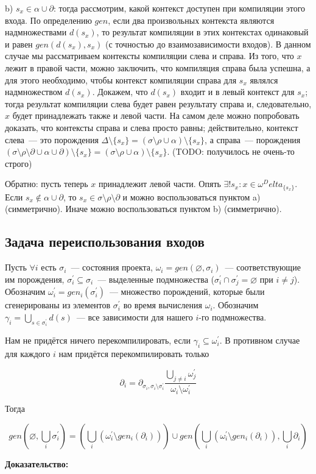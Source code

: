 b) $s_x \in \alpha \cup \partial$: тогда рассмотрим, какой контекст доступен при компиляции этого входа. По определению $gen$, если два произвольных контекста являются надмножествами $d(s_x)$, то результат компиляции в этих контекстах одинаковый и равен $gen(d(s_x), s_x)$ (с точностью до взаимозависимости входов). В данном случае мы рассматриваем контексты компиляции слева и справа. Из того, что $x$ лежит в правой части, можно заключить, что компиляция справа была успешна, а для этого необходимо, чтобы контекст компиляции справа для $s_x$ являлся надмножеством $d(s_x)$. Докажем, что $d(s_x)$ входит и в левый контекст для $s_x$; тогда результат компиляции слева будет равен результату справа и, следовательно, $x$ будет принадлежать также и левой части. На самом деле можно попробовать доказать, что контексты справа и слева просто равны; действительно, контекст слева~--- это порождения $\Delta\setminus\{s_x\} = (\sigma\setminus\rho\cup\alpha)\setminus\{s_x\}$, а справа~--- порождения $(\sigma\setminus\rho\setminus\partial\cup\alpha\cup\partial) \setminus \{s_x\} = (\sigma\setminus\rho\cup\alpha) \setminus \{s_x\}$. (TODO: получилось не очень-то строго)

Обратно: пусть теперь $x$ принадлежит левой части. Опять $\exists ! s_x : x \in \omega^Delta_{\{s_x\}}$. Если $s_x \notin \alpha\cup\partial$, то $s_x \in \sigma\setminus\rho\setminus\partial$ и можно воспользоваться пунктом a) (симметрично). Иначе можно воспользоваться пунктом b) (симметрично).

\subsection{Задача переиспользования входов}

Пусть $\forall i$ есть $\sigma_i$~--- состояния проекта, $\omega_i = gen(\varnothing, \sigma_i)$~--- соответствующие им порождения, $\sigma_i^\prime \subseteq \sigma_i$~--- выделенные подмножества ($\sigma_i^\prime \cap \sigma_j^\prime = \varnothing$ при $i \neq j$). Обозначим $\omega_i^\prime = gen_i(\sigma_i^\prime)$~--- множество порождений, которые были сгенерированы из элементов $\sigma_i^\prime$ во время вычисления $\omega_i$. Обозначим $\gamma_i = \bigcup\limits_{s \in \sigma_i^\prime} d(s)$~--- все зависимости для нашего $i$-го подмножества.

Нам не придётся ничего перекомпилировать, если $\gamma_i \subseteq \omega_i^\prime$. В противном случае для каждого $i$ нам придётся перекомпилировать только

$$\partial_i = \partial_{\sigma_i, \sigma_i\setminus\sigma_i^\prime} \dfrac{\bigcup\limits_{j \neq i} \omega_j^\prime}{\omega_i \setminus \omega_i^\prime}$$

Тогда

$$gen(\varnothing, \bigcup\limits_i \sigma_i^\prime) = \left( \bigcup\limits_i (\omega_i^\prime \setminus gen_i(\partial_i)) \right) \cup gen(\bigcup\limits_i (\omega_i^\prime \setminus gen_i(\partial_i)), \bigcup\limits_i \partial_i)$$

\textbf{Доказательство:} 


